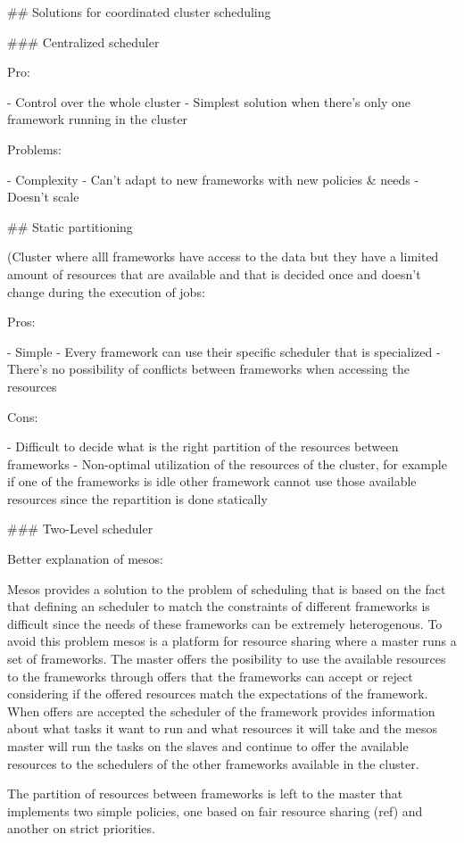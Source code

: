 ## Solutions for coordinated cluster scheduling

### Centralized scheduler

Pro:

- Control over the whole cluster
- Simplest solution when there's only one framework running in the cluster

Problems:

- Complexity
- Can't adapt to new frameworks with new policies & needs
- Doesn't scale

## Static partitioning

(Cluster where alll frameworks have access to the data but they have a
limited amount of resources that are available and that is decided
once and doesn't change during the execution of jobs:

Pros:

- Simple
- Every framework can use their specific scheduler that is specialized
- There's no possibility of conflicts between frameworks when
  accessing the resources

Cons:

- Difficult to decide what is the right partition of the resources
between frameworks
- Non-optimal utilization of the resources of the cluster, for example
if one of the frameworks is idle other framework cannot use those
available resources since the repartition is done statically

### Two-Level scheduler

Better explanation of mesos:

Mesos provides a solution to the problem of scheduling that is based
on the fact that defining an scheduler to match the constraints of different
frameworks is difficult since the needs of these frameworks can be
extremely heterogenous. To avoid this problem mesos is a platform for
resource sharing where a master runs a set of frameworks. The master
offers the posibility to use the available resources to the frameworks
through offers that the frameworks can accept or reject considering if
the offered resources match the expectations of the framework. When
offers are accepted the scheduler of the framework provides
information about what tasks it want to run and what resources it will
take and the mesos master will run the tasks on the slaves and
continue to offer the available resources to the schedulers of the
other frameworks available in the cluster.

The partition of resources between frameworks is left to the master
that implements two simple policies, one based on fair resource
sharing (ref) and another on strict priorities.

